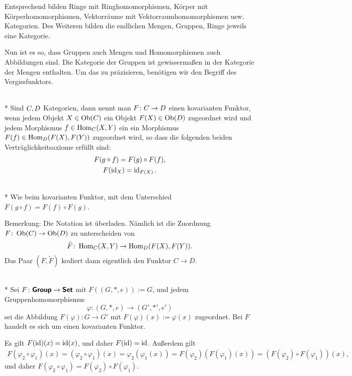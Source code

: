 Entsprechend bilden Ringe mit Ringhomomorphismen, Körper mit
Körperhomomorphismen, Vektorräume mit Vektorraumhomomorphismen
usw. Kategorien. Des Weiteren bilden die endlichen Mengen, Gruppen,
Ringe jeweils eine Kategorie.

Nun ist es so, dass Gruppen auch Mengen und Homomorphismen
auch Abbildungen sind. Die Kategorie der Gruppen ist gewissermaßen
in der Kategorie der Mengen enthalten. Um das zu präzisieren,
benötigen wir den Begriff des Vergissfunktors.

\begin{Definition}\mbox{}\\*
Sind $C,D$ Kategorien, dann nennt man
$F\colon C\to D$ einen
kovarianten Funktor, wenn jedem Objekt $X\in\operatorname{Ob}(C)$ ein Objekt
$F(X)\in\operatorname{Ob}(D)$ zugeordnet wird und jedem Morphismus
$f\in\operatorname{Hom}_{C}(X,Y)$ ein ein Morphismus
$F(f)\in\operatorname{Hom}_{D}(F(X),F(Y))$ zugeordnet wird,
so dass die folgenden beiden Verträglichkeitsaxiome erfüllt sind:%
\begin{gather*}
F(g\circ f) = F(g)\circ F(f),\\
F(\operatorname{id}_X) = \operatorname{id}_{F(X)}.
\end{gather*}
\end{Definition}
\begin{Definition}\mbox{}\\*
Wie beim kovarianten Funktor, mit dem Unterschied
$F(g\circ f) = F(f)\circ F(g)$.
\end{Definition}
Bemerkung: Die Notation ist überladen. Nämlich ist die Zuordnung
$F\colon\operatorname{Ob}(C)\to\operatorname{Ob}(D)$ zu unterscheiden
von
\[\tilde F\colon\operatorname{Hom}_{C}(X,Y)\to\operatorname{Hom}_{D}(F(X),F(Y)).\]
Das Paar $(F,\tilde F)$ kodiert dann eigentlich den Funktor
$C\to D$.

\begin{Satz}[Vergissfunktor]\mbox{}\\*
Sei $F\colon\textsf{\textbf{Group}}\to\textsf{\textbf{Set}}$ mit $F((G,*,e)):=G$,
und jedem Gruppenhomomorphismus%
\[\varphi\colon (G,*,e)\to (G',*',e')\]
sei die Abbildung $F(\varphi)\colon G\to G'$ mit
$F(\varphi)(x):=\varphi(x)$ zugeordnet. Bei $F$ handelt
es sich um einen kovarianten Funktor.
\end{Satz}
Es gilt $F(\operatorname{id})(x) = \operatorname{id}(x)$, und daher $F(\operatorname{id})=\operatorname{id}$.
Außerdem gilt%
\begin{gather*}
F(\varphi_2\circ\varphi_1)(x) = (\varphi_2\circ\varphi_1)(x)
= \varphi_2(\varphi_1(x))
= F(\varphi_2)(F(\varphi_1)(x))
= (F(\varphi_2)\circ F(\varphi_1))(x),
\end{gather*}
und daher $F(\varphi_2\circ\varphi_1)
= F(\varphi_2)\circ F(\varphi_1)$.\;\qedsymbol

